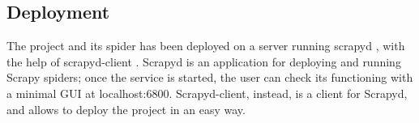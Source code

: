 \subsection{Deployment}
The project and its spider has been deployed on a server\cite{scrapydeploy} running scrapyd \cite{scrapyd}, with the help of scrapyd-client \cite{scrapydclient}. Scrapyd is an application for deploying and running Scrapy spiders; once the service is started, the user can check its functioning with a minimal GUI at localhost:6800. Scrapyd-client, instead, is a client for Scrapyd, and allows to deploy the project in an easy way. \\
